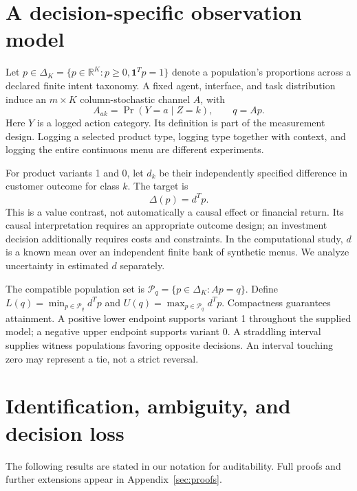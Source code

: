 \documentclass[10pt,twocolumn]{article}
\theoremstyle{definition}\newtheorem{definition}[theorem]{Definition}
\newcommand{\simplex}{\Delta_K}
\newcommand{\R}{\mathbb R}
\newcommand{\1}{\mathbf 1}
\begin{document}
\section{A decision-specific observation model}
Let $p\in\simplex=\{p\in\R^K:p\geq0,\1^Tp=1\}$ denote a population's proportions across a declared finite intent taxonomy. A fixed agent, interface, and task distribution induce an $m\times K$ column-stochastic channel $A$, with
\begin{equation}
 A_{ak}=\Pr(Y=a\mid Z=k),\qquad q=Ap.
\end{equation}
Here $Y$ is a logged action category. Its definition is part of the measurement design. Logging a selected product type, logging type together with context, and logging the entire continuous menu are different experiments.

For product variants 1 and 0, let $d_k$ be their independently specified difference in customer outcome for class $k$. The target is
\begin{equation}\Delta(p)=d^Tp.\end{equation}
This is a value contrast, not automatically a causal effect or financial return. Its causal interpretation requires an appropriate outcome design; an investment decision additionally requires costs and constraints. In the computational study, $d$ is a known mean over an independent finite bank of synthetic menus. We analyze uncertainty in estimated $d$ separately.

The compatible population set is $\mathcal P_q=\{p\in\simplex:Ap=q\}$. Define $L(q)=\min_{p\in\mathcal P_q}d^Tp$ and $U(q)=\max_{p\in\mathcal P_q}d^Tp$. Compactness guarantees attainment. A positive lower endpoint supports variant 1 throughout the supplied model; a negative upper endpoint supports variant 0. A straddling interval supplies witness populations favoring opposite decisions. An interval touching zero may represent a tie, not a strict reversal.

\section{Identification, ambiguity, and decision loss}
The following results are stated in our notation for auditability. Full proofs and further extensions appear in Appendix~\ref{sec:proofs}.
\end{document}
